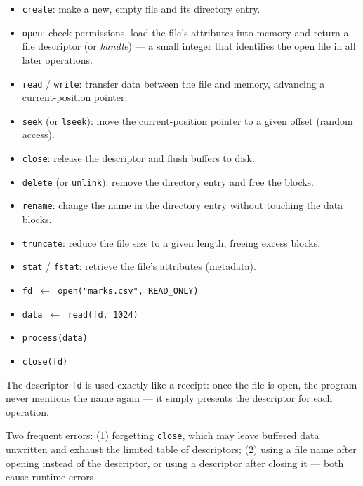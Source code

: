 \documentclass[11pt]{article}
\newcommand{\cle}[1]{{\popxbold\color{popdark}#1}}
\begin{document}
\begin{itemize}
\item \texttt{create}: make a new, empty file and its directory entry.
\item \texttt{open}: check permissions, load the file's attributes into memory and return a \cle{file descriptor} (or \emph{handle}) — a small integer that identifies the open file in all later operations.
\item \texttt{read} / \texttt{write}: transfer data between the file and memory, advancing a current-position pointer.
\item \texttt{seek} (or \texttt{lseek}): move the current-position pointer to a given offset (random access).
\item \texttt{close}: release the descriptor and flush buffers to disk.
\item \texttt{delete} (or \texttt{unlink}): remove the directory entry and free the blocks.
\item \texttt{rename}: change the name in the directory entry without touching the data blocks.
\item \texttt{truncate}: reduce the file size to a given length, freeing excess blocks.
\item \texttt{stat} / \texttt{fstat}: retrieve the file's attributes (metadata).
\end{itemize}

\begin{exemplebox}
\begin{itemize}
\item \texttt{fd $\leftarrow$ open("marks.csv", READ\_ONLY)}
\item \texttt{data $\leftarrow$ read(fd, 1024)}
\item \texttt{process(data)}
\item \texttt{close(fd)}
\end{itemize}
The descriptor \texttt{fd} is used exactly like a receipt: once the file is open, the program never mentions the name again — it simply presents the descriptor for each operation.
\end{exemplebox}

\begin{attention}
Two frequent errors: (1) forgetting \texttt{close}, which may leave buffered data unwritten and exhaust the limited table of descriptors; (2) using a file name after opening instead of the descriptor, or using a descriptor after closing it — both cause runtime errors.
\end{attention}
\end{document}
